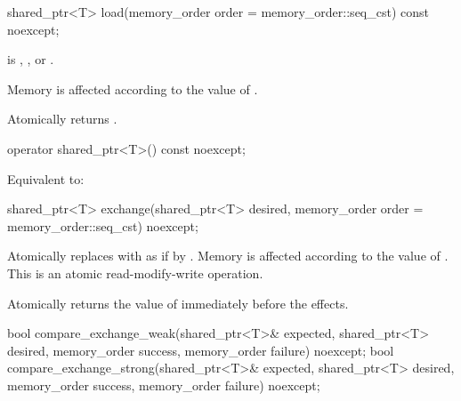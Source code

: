 %
\begin{itemdecl}
shared_ptr<T> load(memory_order order = memory_order::seq_cst) const noexcept;
\end{itemdecl}

\begin{itemdescr}
\pnum
\expects
{} is
,
, or
.

\pnum
\effects
Memory is affected according to the value of .

\pnum
\returns
Atomically returns .
\end{itemdescr}

%
\begin{itemdecl}
operator shared_ptr<T>() const noexcept;
\end{itemdecl}

\begin{itemdescr}
\pnum
\effects
Equivalent to: 
\end{itemdescr}

%
\begin{itemdecl}
shared_ptr<T> exchange(shared_ptr<T> desired, memory_order order = memory_order::seq_cst) noexcept;
\end{itemdecl}

\begin{itemdescr}
\pnum
\effects
Atomically replaces  with 
as if by .
Memory is affected according to the value of .
This is an atomic read-modify-write operation.

\pnum
\returns
Atomically returns the value of  immediately before the effects.
\end{itemdescr}

%
%
\begin{itemdecl}
bool compare_exchange_weak(shared_ptr<T>& expected, shared_ptr<T> desired,
                           memory_order success, memory_order failure) noexcept;
bool compare_exchange_strong(shared_ptr<T>& expected, shared_ptr<T> desired,
                             memory_order success, memory_order failure) noexcept;
\end{itemdecl}

